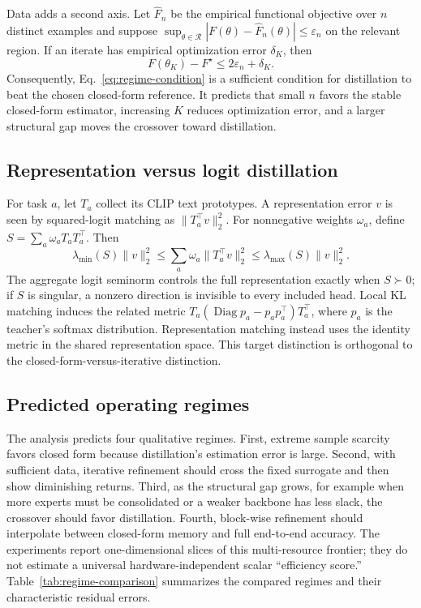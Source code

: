 \documentclass[letterpaper]{article} %
\theoremstyle{plain}
\theoremstyle{definition}
\begin{document}
Data adds a second axis.
Let $\widehat F_n$ be the empirical functional objective over $n$ distinct examples and suppose $\sup_{\theta\in\mathcal R}|F(\theta)-\widehat F_n(\theta)|\le\varepsilon_n$ on the relevant region.
If an iterate has empirical optimization error $\delta_K$, then
\begin{equation}
F(\theta_K)-F^\star\le 2\varepsilon_n+\delta_K.
\label{eq:finite-data-bound-main}
\end{equation}
Consequently, Eq.~\eqref{eq:regime-condition} is a sufficient condition for distillation to beat the chosen closed-form reference.
It predicts that small $n$ favors the stable closed-form estimator, increasing $K$ reduces optimization error, and a larger structural gap moves the crossover toward distillation.

\subsection{Representation versus logit distillation}
\label{sec:head-coverage}

For task $a$, let $T_a$ collect its CLIP text prototypes.
A representation error $v$ is seen by squared-logit matching as $\|T_a^\top v\|_2^2$.
For nonnegative weights $\omega_a$, define $S=\sum_a\omega_aT_aT_a^\top$.
Then
\begin{equation}
\lambda_{\min}(S)\|v\|_2^2
\le\sum_a\omega_a\|T_a^\top v\|_2^2
\le\lambda_{\max}(S)\|v\|_2^2.
\label{eq:frame-main}
\end{equation}
The aggregate logit seminorm controls the full representation exactly when $S\succ0$; if $S$ is singular, a nonzero direction is invisible to every included head.
Local KL matching induces the related metric $T_a(\operatorname{Diag}p_a-p_ap_a^\top)T_a^\top$, where $p_a$ is the teacher's softmax distribution.
Representation matching instead uses the identity metric in the shared representation space.
This target distinction is orthogonal to the closed-form-versus-iterative distinction.

\subsection{Predicted operating regimes}
\label{sec:predictions}

The analysis predicts four qualitative regimes.
First, extreme sample scarcity favors closed form because distillation's estimation error is large.
Second, with sufficient data, iterative refinement should cross the fixed surrogate and then show diminishing returns.
Third, as the structural gap grows, for example when more experts must be consolidated or a weaker backbone has less slack, the crossover should favor distillation.
Fourth, block-wise refinement should interpolate between closed-form memory and full end-to-end accuracy.
The experiments report one-dimensional slices of this multi-resource frontier; they do not estimate a universal hardware-independent scalar ``efficiency score.'' Table~\ref{tab:regime-comparison} summarizes the compared regimes and their characteristic residual errors.
\end{document}

